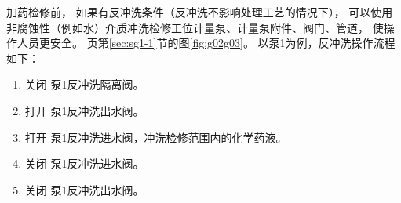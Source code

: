 
加药检修前，
如果有反冲洗条件（反冲洗不影响处理工艺的情况下），
可以使用非腐蚀性（例如水）介质冲洗检修工位计量泵、计量泵附件、阀门、管道，
使操作人员更安全。
\pageref{sec:sg1-1}页第\ref{sec:sg1-1}节的图\ref{fig:g02g03}。
以泵1为例，反冲洗操作流程如下：
\begin{enumerate}
    \item 关闭 泵1反冲洗隔离阀。
    \item 打开 泵1反冲洗出水阀。
    \item 打开 泵1反冲洗进水阀，冲洗检修范围内的化学药液。
    \item 关闭 泵1反冲洗进水阀。
    \item 关闭 泵1反冲洗出水阀。
\end{enumerate}

